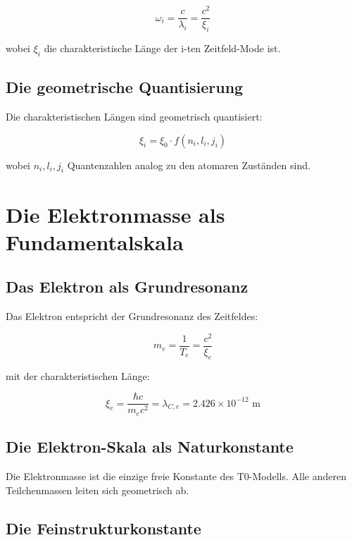 \documentclass[12pt,a4paper]{report}
\begin{document}
	\begin{equation}
		\omega_i = \frac{c}{\lambda_i} = \frac{c^2}{\xi_i}
	\end{equation}
	
	wobei $\xi_i$ die charakteristische Länge der i-ten Zeitfeld-Mode ist.
	
	\subsection{Die geometrische Quantisierung}
	
	Die charakteristischen Längen sind geometrisch quantisiert:
	
	\begin{equation}
		\xi_i = \xi_0 \cdot f(n_i, l_i, j_i)
	\end{equation}
	
	wobei $n_i, l_i, j_i$ Quantenzahlen analog zu den atomaren Zuständen sind.
	
	\section{Die Elektronmasse als Fundamentalskala}
	
	\subsection{Das Elektron als Grundresonanz}
	
	Das Elektron entspricht der Grundresonanz des Zeitfeldes:
	
	\begin{equation}
		m_e = \frac{1}{T_e} = \frac{c^2}{\xi_e}
	\end{equation}
	
	mit der charakteristischen Länge:
	
	\begin{equation}
		\xi_e = \frac{\hbar c}{m_e c^2} = \lambda_{C,e} = 2.426 \times 10^{-12} \text{ m}
	\end{equation}
	
	\subsection{Die Elektron-Skala als Naturkonstante}
	
	Die Elektronmasse ist die einzige freie Konstante des T0-Modells. Alle anderen Teilchenmassen leiten sich geometrisch ab.
	
	\subsection{Die Feinstrukturkonstante}
	
\end{document}
